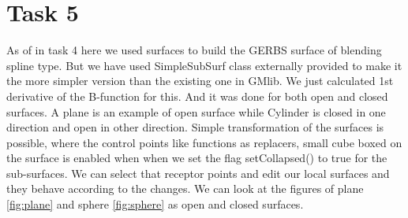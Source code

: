 \documentclass[a4,10pt]{article}
\begin{document}
\section{Task 5}
As of in task 4 here we used surfaces to build the GERBS surface of blending spline type. But we have used SimpleSubSurf class externally provided to make it the more simpler version than
the existing one in GMlib. We just calculated 1st derivative of the B-function for this. And it was done for both open and closed surfaces. A plane is an example of open surface while Cylinder is
closed in one direction and open in other direction. Simple transformation of the surfaces is possible, where the control points like functions as replacers, small cube boxed on the surface is enabled when when we set the flag setCollapsed() to true for the sub-surfaces.
We can select that receptor points and edit our local surfaces and they behave according to the changes.
We can look at the figures of plane \cref{fig:plane} and sphere \cref{fig:sphere} as open and closed surfaces.
\end{document}
